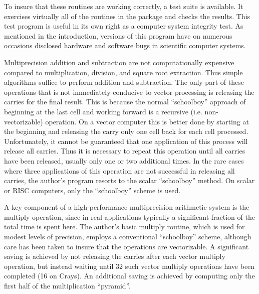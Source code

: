 To insure that these routines are working correctly, a test suite is
available.  It exercises virtually all of the routines in the package
and checks the results.  This test program is useful in its own right
as a computer system integrity test.  As mentioned in the
introduction, versions of this program have on numerous occasions
disclosed hardware and software bugs in scientific computer systems.

\vspace{2ex}

Multiprecision addition and subtraction are not computationally
expensive compared to multiplication, division, and square root
extraction.  Thus simple algorithms suffice to perform addition and
subtraction.  The only part of these operations that is not
immediately conducive to vector processing is releasing the carries
for the final result.  This is because the normal ``schoolboy''
approach of beginning at the last cell and working forward is a
recursive (i.e. non-vectorizable) operation.  On a vector computer
this is better done by starting at the beginning and releasing the
carry only one cell back for each cell processed.  Unfortunately, it
cannot be guaranteed that one application of this process will release
all carries.  Thus it is necessary to repeat this operation until all
carries have been released, usually only one or two additional times.
In the rare cases where three applications of this operation are not
successful in releasing all carries, the author's program resorts to
the scalar ``schoolboy'' method.  On scalar or RISC computers, only
the ``schoolboy'' scheme is used.

A key component of a high-performance multiprecision arithmetic system
is the multiply operation, since in real applications typically a
significant fraction of the total time is spent here.  The author's
basic multiply routine, which is used for modest levels of precision,
employs a conventional ``schoolboy'' scheme, although care has been
taken to insure that the operations are vectorizable.  A significant
saving is achieved by not releasing the carries after each vector
multiply operation, but instead waiting until 32 such vector multiply
operations have been completed (16 on Crays).  An additional saving is
achieved by computing only the first half of the multiplication
``pyramid''.

